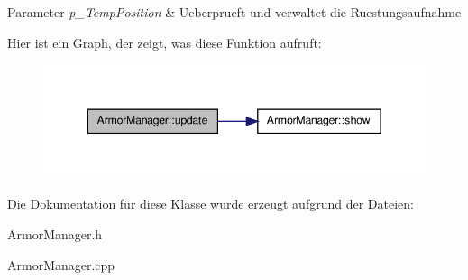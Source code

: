 \begin{DoxyParams}{Parameter}
{\em p\-\_\-\-Temp\-Position} & Ueberprueft und verwaltet die Ruestungsaufnahme \\
\hline
\end{DoxyParams}


Hier ist ein Graph, der zeigt, was diese Funktion aufruft\-:
\nopagebreak
\begin{figure}[H]
\begin{center}
\leavevmode
\includegraphics[width=342pt]{class_armor_manager_a6f608963c4a1efb31b2d658ee5246459_cgraph}
\end{center}
\end{figure}




Die Dokumentation für diese Klasse wurde erzeugt aufgrund der Dateien\-:\begin{DoxyCompactItemize}
\item 
Armor\-Manager.\-h\item 
Armor\-Manager.\-cpp\end{DoxyCompactItemize}
